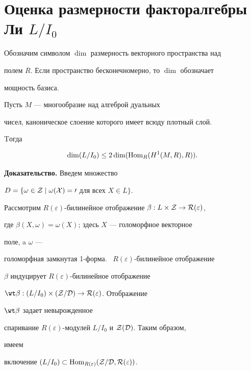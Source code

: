  


 


\section{Оценка размерности факторалгебры Ли $L/I_0$} 


 


Обозначим символом $\dim$ размерность векторного пространства над 


полем $R$. Если пространство бесконечномерно, то $\dim$ обозначает 


мощность базиса. 


 


\begin{thms} 


Пусть $M$ --- многообразие над алгеброй дуальных 


чисел, каноническое слоение которого имеет всюду плотный слой.


Tогда 


$$ 


\dim(L/I_0)\le2\dim(\Hom_R(H^1(M,R),R)). 


$$ 


\end{thms} 


 


{\bf Доказательство.} Введем множество 


$D=\{\omega\in\cal Z\mid\omega(X)=0$ для всех $X\in L\}$. 


Рассмотрим $R(\varepsilon)$-билинейное отображение $\beta:L\times\cal 


Z\to R(\varepsilon)$, 


где $\beta(X,\omega)=\omega(X)$; здесь $X$ --- голоморфное векторное 


поле, a $\omega$ --- 


голоморфная замкнутая 1-форма. \ $R(\varepsilon)$-билинейное отображение 


$\beta$ индуцирует $R(\varepsilon)$-билинейное отображение 


$\wt\beta:(L/I_0)\times(\cal Z/D)\to R(\varepsilon)$. Отображение 


$\wt\beta$ задает невырожденное 


спаривание $R(\varepsilon)$-модулей $L/I_0$ и $\cal Z(D)$. Таким образом, 


имеем 


включение $(L/I_0)\subset\operatorname{Hom}_{R(\varepsilon)}(\cal Z/D,R(\varepsilon))$. 


